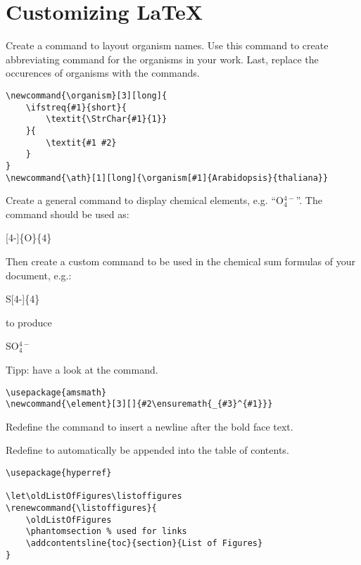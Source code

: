 \section{Customizing {\LaTeX}}

\question Create a command  to layout organism names. Use this
command to create abbreviating command for the organisms in your work. Last,
replace the occurences of organisms with the commands.
\begin{solution} 
	\begin{lstlisting}
\newcommand{\organism}[3][long]{
	\ifstreq{#1}{short}{
		\textit{\StrChar{#1}{1}}
	}{
		\textit{#1 #2}
	}
}
\newcommand{\ath}[1][long]{\organism[#1]{Arabidopsis}{thaliana}}
\end{lstlisting}
\end{solution}

\question Create a general command to display chemical elements, e.g.
``O$_4^{4-}$''. The command should be used as: 
\begin{center}[4-]\{O\}\{4\}\end{center}
Then create a custom command to be used in the chemical sum formulas of
your document, e.g.:
\begin{center}
	S[4-]\{4\}
\end{center}
to produce
	\begin{center}
		SO$_4^{4-}$
	\end{center}
Tipp: have a look at the  command.
\begin{solution} 
	\begin{lstlisting}
\usepackage{amsmath}
\newcommand{\element}[3][]{#2\ensuremath{_{#3}^{#1}}}
\end{lstlisting}
\end{solution}


\question Redefine the command  to insert a newline after the
bold face text. 
\begin{solution}
	
\end{solution}

\question Redefine  to automatically be appended into the
table of contents.
\begin{solution}
	\begin{lstlisting}
\usepackage{hyperref}

\let\oldListOfFigures\listoffigures
\renewcommand{\listoffigures}{
	\oldListOfFigures
	\phantomsection % used for links
	\addcontentsline{toc}{section}{List of Figures}
}
\end{lstlisting}
\end{solution}

